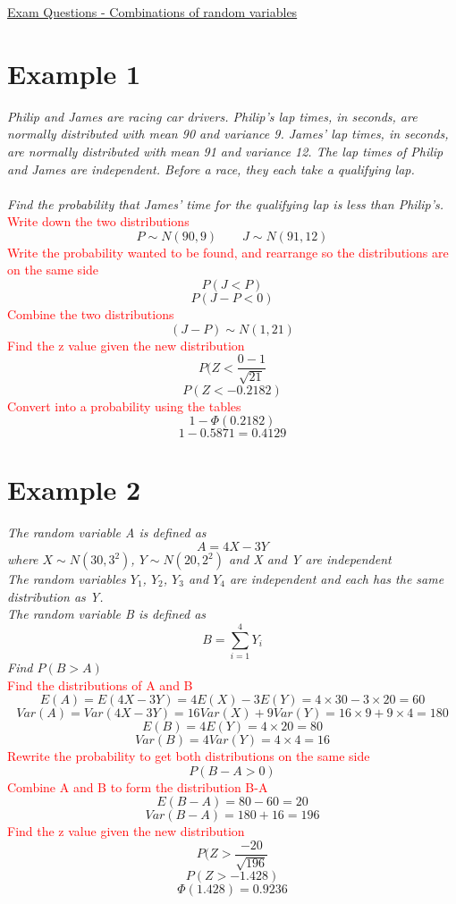 \documentclass{article}[18pt]
\begin{document}
\begin{center}
\underline{\huge Exam Questions - Combinations of random variables}
\end{center}
\section{Example 1}
\textit{Philip and James are racing car drivers. Philip’s lap times, in seconds, are normally distributed with mean 90 and variance 9. James’ lap times, in seconds, are normally distributed with mean 91 and variance 12. The lap times of Philip and James are independent. Before a race, they each take a qualifying lap.\\
\\
Find the probability that James’ time for the qualifying lap is less than Philip’s.}\\
\textcolor{red}{Write down the two distributions}
$$P\sim N(90,9) \qquad J\sim N(91,12)$$
\textcolor{red}{Write the probability wanted to be found, and rearrange so the distributions are on the same side}
$$P(J<P)$$
$$P(J-P<0)$$
\textcolor{red}{Combine the two distributions}
$$(J-P)\sim N(1,21)$$
\textcolor{red}{Find the z value given the new distribution}
$$P(Z<\frac{0-1}{\sqrt{21}}$$
$$P(Z<-0.2182)$$
\textcolor{red}{Convert into a probability using the tables}
$$1-\Phi(0.2182)$$
$$1-0.5871=0.4129$$
\newpage
\section{Example 2}
\textit{The random variable A is defined as}
$$A=4X-3Y$$
\textit{where $X\sim N(30,3^2)$, $Y\sim N(20,2^2)$ and X and Y are independent\\
The random variables $Y_1$, $Y_2$, $Y_3$ and $Y_4$ are independent and each has the same distribution as Y.\\
The random variable B is defined as}
$$B=\sum^4_{i=1}Y_i$$
\textit{Find $P(B>A)$}\\
\textcolor{red}{Find the distributions of A and B}
$$E(A)=E(4X-3Y)=4E(X)-3E(Y)=4\times30-3\times20=60$$
$$Var(A)=Var(4X-3Y)=16Var(X)+9Var(Y)=16\times9+9\times4=180$$
$$E(B)=4E(Y)=4\times20=80$$
$$Var(B)=4Var(Y)=4\times4=16$$
\textcolor{red}{Rewrite the probability to get both distributions on the same side}
$$P(B-A>0)$$
\textcolor{red}{Combine A and B to form the distribution B-A}
$$E(B-A)=80-60=20$$
$$Var(B-A)=180+16=196$$
\textcolor{red}{Find the z value given the new distribution}
$$P(Z>\frac{-20}{\sqrt{196}}$$
$$P(Z>-1.428)$$
$$\Phi(1.428)=0.9236$$

 
\end{document}

